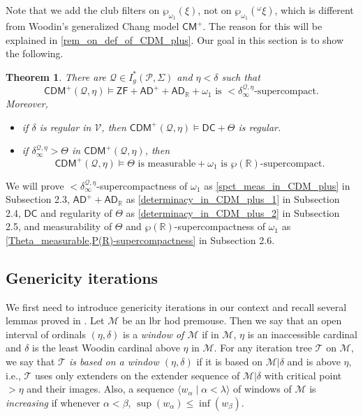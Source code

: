 \documentclass{amsart}
\newtheorem{thm}[dfn]{Theorem}
\newcommand{\power}{\wp}
\begin{document}
Note that we add the club filters on $\power_{\omega_1}(\xi)$, not on $\power_{\omega_1}({}^{\omega}\xi)$, which is different from Woodin's generalized Chang model $\mathsf{CM}^+$.
The reason for this will be explained in \cref{rem_on_def_of_CDM_plus}.
Our goal in this section is to show the following.

\begin{thm}\label{main_thm_1}
There are $\mathcal{Q}\in I^*_g(\mathcal{P}, \Sigma)$ and $\eta<\delta$ such that
\[
\mathsf{CDM}^{+}(\mathcal{Q}, \eta)\models\mathsf{ZF} + \mathsf{AD}^{+} + \mathsf{AD}_{\mathbb{R}} + \text{$\omega_1$ is ${<}\delta^{\mathcal{Q}, \eta}_{\infty}$-supercompact.}
\]
Moreover,
\begin{itemize}
\item if $\delta$ is regular in $\mathcal{V}$, then $\mathsf{CDM}^{+}(\mathcal{Q}, \eta)\models\mathsf{DC}+\Theta$ is regular.
\item if $\delta^{\mathcal{Q}, \eta}_{\infty}>\Theta$ in $\mathsf{CDM}^+(\mathcal{Q}, \eta)$, then
\[
\mathsf{CDM}^+(\mathcal{Q}, \eta)\models
\Theta\text{ is measurable}+\omega_1\text{ is } \power(\mathbb{R})\text{-supercompact.}
\]
\end{itemize}
\end{thm}

We will prove ${<}\delta^{\mathcal{Q}, \eta}_{\infty}$-supercompactness of $\omega_1$ as \cref{spct_meas_in_CDM_plus} in Subsection 2.3, $\mathsf{AD}^+ +\mathsf{AD}_{\mathbb{R}}$ as \cref{determinacy_in_CDM_plus_1} in Subsection 2.4, 
$\mathsf{DC}$ and regularity of $\Theta$ as \cref{determinacy_in_CDM_plus_2} in Subsection 2.5, and measurability of $\Theta$ and $\power(\mathbb{R})$-supercompactness of $\omega_1$ as \cref{Theta_measurable,P(R)-supercompactness} in Subsection 2.6.

\subsection{Genericity iterations}

We first need to introduce genericity iterations in our context and recall several lemmas proved in \cite{CoveringChang}.
Let $\mathcal{M}$ be an lbr hod premouse.
Then we say that an open interval of ordinals $(\eta, \delta)$ is a \emph{window of $\mathcal{M}$} if in $\mathcal{M}$, $\eta$ is an inaccessible cardinal and $\delta$ is the least Woodin cardinal above $\eta$ in $\mathcal{M}$.
For any iteration tree $\mathcal{T}$ on $\mathcal{M}$, we say that \emph{$\mathcal{T}$ is based on a window $(\eta, \delta)$} if it is based on $\mathcal{M}\vert\delta$ and is above $\eta$, i.e., $\mathcal{T}$ uses only extenders on the extender sequence of $\mathcal{M}\vert\delta$ with critical point $>\eta$ and their images.
Also, a sequence $\langle w_{\alpha}\mid\alpha<\lambda\rangle$ of windows of $\mathcal{M}$ is \emph{increasing} if whenever $\alpha<\beta$, $\sup(w_{\alpha})\leq\inf(w_{\beta})$.
\end{document}
